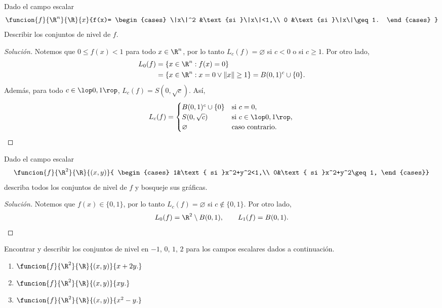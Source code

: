 \documentclass[a4,11pt]{aleph-notas}
\begin{document}
\encabezado

\begin{ejer}
    Dado el campo escalar
    \[
       \funcion{f}{\R^n}{\R}{x}
       {f(x)=
           \begin{cases}
               \|x\|^2 &\text{si }\|x\|<1,\\
               0 &\text{si }\|x\|\geq 1.
           \end{cases}
       }
    \]
    Describir los conjuntos de nivel de $f$.
\end{ejer}

\begin{proof}[Solución]
    Notemos que $0\leq f(x) < 1$ para todo $x\in\R^n$, por lo tanto $L_c(f)=\varnothing$ si $c<0$ o si $c\geq 1$. Por otro lado,
    \begin{align*}
        L_0(f)
            &= \{ x\in\R^n: f(x)=0 \}\\
            &= \{ x\in\R^n: x=0 \lor \|x\|\geq 1 \}
             = B(0,1)^c\cup\{0\}.
    \end{align*}
    Además, para todo $c\in\lop0,1\rop$, $L_c(f) = S(0,\sqrt{c})$.
    Así,
    \[
        L_c(f)=
        \begin{cases}
            B(0,1)^c\cup\{0\} &\text{si }c=0,\\
            S(0,\sqrt{c}) &\text{si }c\in\lop0,1\rop,\\
            \varnothing &\text{caso contrario.}
        \end{cases}\qedhere
    \]
\end{proof}

\begin{ejer}
    Dado el campo escalar
    \[
        \funcion{f}{\R^2}{\R}{(x,y)}{
         \begin{cases}
            1&\text{ si }x^2+y^2<1,\\
            0&\text{ si }x^2+y^2\geq 1,
         \end{cases}}
    \]
    describa todos los conjuntos de nivel de $f$ y bosqueje sus gráficas.
\end{ejer}

\begin{proof}[Solución]
    Notemos que $f(x)\in \{0,1\}$, por lo tanto $L_c(f)=\varnothing$ si $c \not\in \{0,1\}$. Por otro lado,
    \[
        L_0(f) = \R^2 \setminus B(0,1),
        \qquad
        L_1(f) = B(0,1).
    \]
\end{proof}

\begin{ejer}
    Encontrar y describir los conjuntos de nivel en $-1$, $0$, $1$, $2$ para los campos escalares dados a continuación.
    \begin{enumerate}
    \item $\funcion{f}{\R^2}{\R}{(x,y)}{x+2y.}$
    \item $\funcion{f}{\R^2}{\R}{(x,y)}{xy.}$
    \item $\funcion{f}{\R^2}{\R}{(x,y)}{x^2-y.}$
    \end{enumerate}
\end{ejer}
\end{document}
